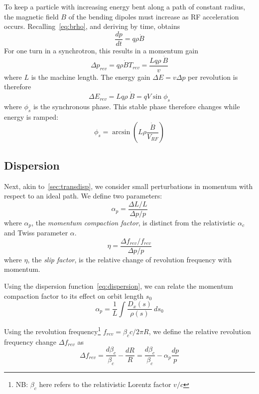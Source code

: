 \documentclass[a4paper,twoside,11pt]{report}
\begin{document}
To keep a particle with increasing energy bent along a path of constant radius, the magnetic field $B$ of the bending dipoles must increase as RF acceleration occurs. Recalling~\autoref{eq:brho}, and deriving by time, obtains
\begin{equation}
  \frac{dp}{dt} = q\rho\dot B
\end{equation}
For one turn in a synchrotron, this results in a momentum gain
\begin{equation}
  \Delta p_{rev} = q\rho\dot B T_{rev}=\frac{Lq\rho~\dot B}v
\end{equation} where $L$ is the machine length. 
The energy gain $\Delta E=v\Delta p$ per revolution is therefore
\begin{equation}
  \Delta E_{rev} = Lq\rho~\dot B=qV\sin \phi_s
  \label{eq:ef_sin}
\end{equation} where $\phi_s$ is the synchronous phase. This stable phase therefore changes while energy is ramped:
\begin{equation}
  \phi_s=\arcsin\left(L\rho\frac{\dot B}{V_{RF}}\right)
  \label{eq:sync_phase}
\end{equation}

\subsection{Dispersion}

Next, akin to~\autoref{sec:transdisp}, we consider small perturbations in momentum with respect to an ideal path. We define two parameters:
\begin{equation}
  \alpha_p = \frac{\Delta L/L}{\Delta p/p}
\end{equation} where $\alpha_p$, the \textit{momentum compaction factor}, is distinct from the relativistic $\alpha_c$ and Twiss parameter $\alpha$.
\begin{equation}
  \eta = \frac{\Delta f_{rev}/f_{rev}}{\Delta p/p}
  \label{eq:slip_factor}
\end{equation} where $\eta$, the \textit{slip factor}, is the relative change of revolution frequency with momentum.

Using the dispersion function~\autoref{eq:dispersion}, we can relate the momentum compaction factor to its effect on orbit length $s_0$~\cite[5.1]{lbd:tecker}
\begin{equation}
  \alpha_p=\frac 1L\int\frac{D_x(s)}{\rho(s)}\ ds_0
\end{equation}

Using the revolution frequency\footnote{NB: $\beta_c$ here refers to the relativistic Lorentz factor $v/c$ } $f_{rev}=\beta_c c/2\pi R$, we define the relative revolution frequency change $\Delta f_{rev}$ as
\begin{equation}
  \Delta f_{rev} = \frac{d\beta_c}{\beta_c}-\frac{dR}R=\frac{d\beta_c}{\beta_c}-\alpha_p\frac{dp}p
\end{equation} 
\end{document}
